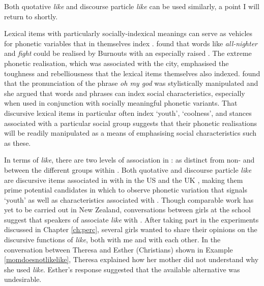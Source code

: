 \noindent Both quotative \textit{like} and discourse particle \textit{like} can be used similarly, a point I will return to shortly.

Lexical items with particularly socially-indexical meanings can serve as vehicles for phonetic variables that in themselves index . \citet{eckert1996} found that words like \textit{all-nighter} and \textit{fight} could be realised by Burnouts with an especially raised  . The extreme phonetic realisation, which was associated with the city, emphasised the toughness and rebelliousness that the lexical items themselves also indexed. \citet{chun2007} found that the pronunciation of the phrase \textit{oh my god} was stylistically manipulated and she argued that words and phrases can index social characteristics, especially when used in conjunction with socially meaningful phonetic variants. That discursive lexical items in particular often index `youth', `coolness', and stances associated with a particular social group suggests that their phonetic realisations will be readily manipulated as a means of emphasising social characteristics such as these.







In terms of \textit{like}, there are two levels of association in :  as distinct from non- and between the different groups within . Both quotative and discourse particle \textit{like} are discursive items associated in  with  in the US and the UK \citep{daileyocain2000,buchstaller2006}, making them prime potential candidates in which to observe phonetic variation that signals `youth' as well as characteristics associated with . Though comparable work has yet to be carried out in New Zealand, conversations between girls at the school suggest that speakers of  associate \textit{like} with . After taking part in the  experiments discussed in Chapter \ref{ch:perc}, several girls wanted to share their opinions on the discursive functions of \textit{like}, both with me and with each other. In the conversation between Theresa and Esther (Christians) shown in Example \ref{momdoesnotlikelike}, Theresa explained how her mother did not understand why she used \textit{like}. Esther's response suggested that the available alternative was undesirable.



